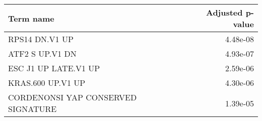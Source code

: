 \begin{tabular}{lr}
\toprule
                         Term name &  Adjusted p-value \\
\midrule
                    RPS14 DN.V1 UP &          4.48e-08 \\
                   ATF2 S UP.V1 DN &          4.93e-07 \\
              ESC J1 UP LATE.V1 UP &          2.59e-06 \\
                 KRAS.600 UP.V1 UP &          4.30e-06 \\
CORDENONSI YAP CONSERVED SIGNATURE &          1.39e-05 \\
\bottomrule
\end{tabular}
